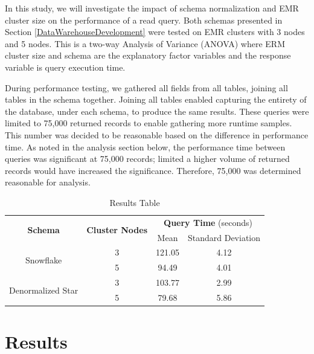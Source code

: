 \documentclass[journal]{IEEEtran}
\begin{document}
In this study, we will investigate the impact of schema normalization and
 EMR cluster size on the performance of a read query.
Both schemas presented in Section \ref{DataWarehouseDevelopment} were tested on
 EMR clusters with 3 nodes and 5 nodes.
This is a two-way Analysis of Variance (ANOVA) where ERM cluster size and schema
 are the explanatory factor variables and the response variable is query
 execution time.


During performance testing, we gathered all fields from all tables,
 joining all tables in the schema together. 
Joining all tables enabled capturing the entirety of the database,
 under each schema, to produce the same results. 
These queries were limited to 75,000 returned records to enable gathering more runtime samples. 
This number was decided to be reasonable based on the difference in performance time. 
As noted in the analysis section below,
 the performance time between queries was significant at 75,000 records;
 limited a higher volume of returned records would have increased the significance. 
Therefore, 75,000 was determined reasonable for analysis.


\begin{table}
	\renewcommand{\arraystretch}{1.3}
	\caption{Results Table}
	\label{ResultsTable}
	\centering
	\begin{tabular}{c c c c}
		\hline
		\hline
		\multirow{2}{*}{\textbf{Schema}} & \multirow{2}{*}{\textbf{Cluster Nodes}} &
		\multicolumn{2}{c}{\textbf{Query Time} (seconds)}   \\
		\cline{3-4}
		&     & Mean & Standard Deviation\\
		\hline
		\multirow{2}{*}{Snowflake}         & 3   & 121.05 & 4.12 \\
		
		& 5   & 94.49 & 4.01  \\
		
		\hline
		\multirow{2}{*}{Denormalized Star} & 3   & 103.77 & 2.99 \\
		
		& 5   & 79.68 & 5.86  \\
		
		\hline
		\hline
	\end{tabular}
\end{table}

\section{Results}
\end{document}
